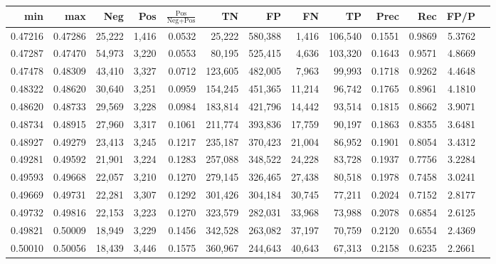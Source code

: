 \begin{tabular}{rrrrrrrrrrrrr}
\toprule
    min &     max &    Neg &   Pos & $\frac{\text{Pos}}{\text{Neg}+\text{Pos}}$ &      TN &      FP &      FN &      TP &   Prec &    Rec &   FP/P \\
\midrule
0.47216 & 0.47286 & 25,222 & 1,416 &                                     0.0532 &  25,222 & 580,388 &   1,416 & 106,540 & 0.1551 & 0.9869 & 5.3762 \\
0.47287 & 0.47470 & 54,973 & 3,220 &                                     0.0553 &  80,195 & 525,415 &   4,636 & 103,320 & 0.1643 & 0.9571 & 4.8669 \\
0.47478 & 0.48309 & 43,410 & 3,327 &                                     0.0712 & 123,605 & 482,005 &   7,963 &  99,993 & 0.1718 & 0.9262 & 4.4648 \\
0.48322 & 0.48620 & 30,640 & 3,251 &                                     0.0959 & 154,245 & 451,365 &  11,214 &  96,742 & 0.1765 & 0.8961 & 4.1810 \\
0.48620 & 0.48733 & 29,569 & 3,228 &                                     0.0984 & 183,814 & 421,796 &  14,442 &  93,514 & 0.1815 & 0.8662 & 3.9071 \\
0.48734 & 0.48915 & 27,960 & 3,317 &                                     0.1061 & 211,774 & 393,836 &  17,759 &  90,197 & 0.1863 & 0.8355 & 3.6481 \\
0.48927 & 0.49279 & 23,413 & 3,245 &                                     0.1217 & 235,187 & 370,423 &  21,004 &  86,952 & 0.1901 & 0.8054 & 3.4312 \\
0.49281 & 0.49592 & 21,901 & 3,224 &                                     0.1283 & 257,088 & 348,522 &  24,228 &  83,728 & 0.1937 & 0.7756 & 3.2284 \\
0.49593 & 0.49668 & 22,057 & 3,210 &                                     0.1270 & 279,145 & 326,465 &  27,438 &  80,518 & 0.1978 & 0.7458 & 3.0241 \\
0.49669 & 0.49731 & 22,281 & 3,307 &                                     0.1292 & 301,426 & 304,184 &  30,745 &  77,211 & 0.2024 & 0.7152 & 2.8177 \\
0.49732 & 0.49816 & 22,153 & 3,223 &                                     0.1270 & 323,579 & 282,031 &  33,968 &  73,988 & 0.2078 & 0.6854 & 2.6125 \\
0.49821 & 0.50009 & 18,949 & 3,229 &                                     0.1456 & 342,528 & 263,082 &  37,197 &  70,759 & 0.2120 & 0.6554 & 2.4369 \\
0.50010 & 0.50056 & 18,439 & 3,446 &                                     0.1575 & 360,967 & 244,643 &  40,643 &  67,313 & 0.2158 & 0.6235 & 2.2661 \\

\end{tabular}
